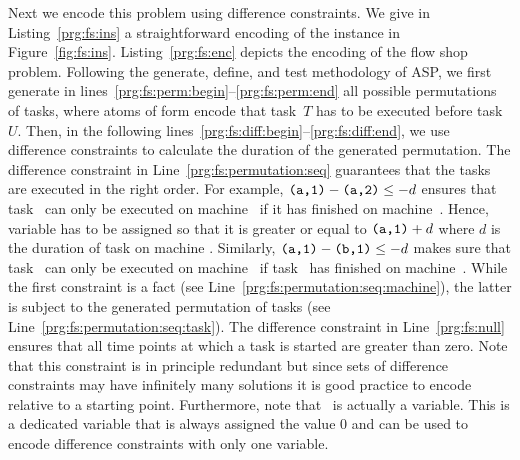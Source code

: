 \begin{example}


%
Next we encode this problem using difference constraints.
We give in Listing~\ref{prg:fs:ins} a straightforward encoding of the instance in Figure~\ref{fig:fs:ins}.
Listing~\ref{prg:fs:enc} depicts the encoding of the flow shop problem.
Following the generate, define, and test methodology of ASP,
we first generate in lines~\ref{prg:fs:perm:begin}--\ref{prg:fs:perm:end} all possible permutations of tasks,
where atoms of form  encode that task~$T$ has to be executed before task~$U$.
Then, in the following lines~\ref{prg:fs:diff:begin}--\ref{prg:fs:diff:end},
we use difference constraints to calculate the duration of the generated permutation.
%
The difference constraint in Line~\ref{prg:fs:permutation:seq} guarantees that the tasks are executed in the right order.
For example, $\texttt{(a,1)} - \texttt{(a,2)} \leq -d$ ensures that task~ can only be executed on machine~ if it has finished on machine~.
Hence, variable  has to be assigned so that it is greater or equal to $\texttt{(a,1)}+d$ where $d$ is the duration of task  on machine .
Similarly, $\texttt{(a,1)} - \texttt{(b,1)} \leq -d$ makes sure that task~ can only be executed on machine~ if task~ has finished on machine~.
While the first constraint is a fact (see Line~\ref{prg:fs:permutation:seq:machine}),
the latter is subject to the generated permutation of tasks (see Line~\ref{prg:fs:permutation:seq:task}).
%
The difference constraint in Line~\ref{prg:fs:null} ensures that all time points at which a task is started are greater than zero.
Note that this constraint is in principle redundant
but since sets of difference constraints may have infinitely many solutions
it is good practice to encode relative to a starting point.
Furthermore, note that~ is actually a variable.
This is a dedicated variable that is always assigned the value 0 and can be used to encode difference constraints with only one variable.


\end{example}
